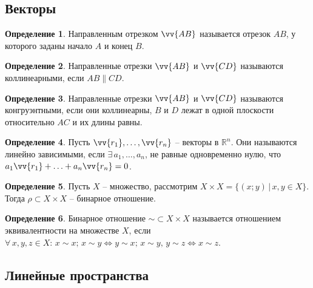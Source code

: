 \documentclass[12pt]{article}
\theoremstyle{definition}
\newtheorem{definition}{Определение}
\newcommand{\R}{\mathbb{R}}
\begin{document}
\subsection{Векторы}

\begin{definition}
    Направленным отрезком $\vv{AB}$ называется отрезок $AB$, у которого заданы начало $A$ и конец $B$.
\end{definition}
\begin{definition}
    Направленные отрезки $\vv{AB}$ и $\vv{CD}$ называются коллинеарными, если $AB\parallel CD$.
\end{definition}
\begin{definition}
    Направленные отрезки $\vv{AB}$ и $\vv{CD}$ называются конгруэнтными, если они коллинеарны, $B$ и $D$ лежат в одной плоскости относительно $AC$ и их длины равны.
\end{definition}
\begin{definition}
    Пусть $\vv{r_1},\ldots,\vv{r_n}$ – векторы в $\R^n$. Они называются линейно зависимыми, если $\exists\,a_1,\ldots,a_n$, не равные одновременно нулю, что $a_1\vv{r_1}+\ldots+a_n\vv{r_n}=0$.
\end{definition}
\begin{definition}
    Пусть $X$ – множество, рассмотрим $X\times X=\{(x;y)\,|\,x,y\in X\}$. Тогда $\rho\subset X\times X$ – бинарное отношение.
\end{definition}
\begin{definition}
    Бинарное отношение $\sim\subset X\times X$ называется отношением эквивалентности на множестве $X$, если $\forall\,x,y,z\in X:\,x\sim x;\,x\sim y\iff y\sim x;\,x\sim y,\,y\sim z\iff x\sim z$.
\end{definition}

\subsection{Линейные пространства}
\end{document}
